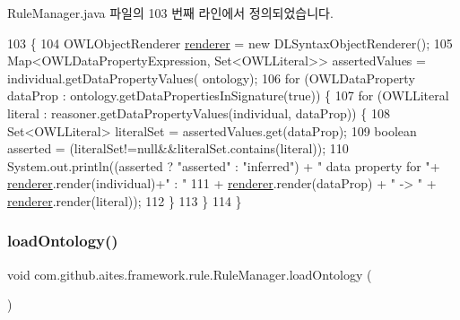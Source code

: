 Rule\+Manager.\+java 파일의 103 번째 라인에서 정의되었습니다.


\begin{DoxyCode}
103                                                                                                            
                     \{ 
104         OWLObjectRenderer \mbox{\hyperlink{classcom_1_1github_1_1aites_1_1framework_1_1rule_1_1_rule_manager_ae2bee87a9984ec9463cc7eaa5cc9952f}{renderer}} = \textcolor{keyword}{new} DLSyntaxObjectRenderer(); 
105         Map<OWLDataPropertyExpression, Set<OWLLiteral>> assertedValues = individual.getDataPropertyValues(
      ontology); 
106         \textcolor{keywordflow}{for} (OWLDataProperty dataProp : ontology.getDataPropertiesInSignature(\textcolor{keyword}{true})) \{ 
107             \textcolor{keywordflow}{for} (OWLLiteral literal : reasoner.getDataPropertyValues(individual, dataProp)) \{ 
108                 Set<OWLLiteral> literalSet = assertedValues.get(dataProp); 
109                 \textcolor{keywordtype}{boolean} asserted = (literalSet!=null&&literalSet.contains(literal)); 
110                 System.out.println((asserted ? \textcolor{stringliteral}{"asserted"} : \textcolor{stringliteral}{"inferred"}) + \textcolor{stringliteral}{" data property for "}+
      \mbox{\hyperlink{classcom_1_1github_1_1aites_1_1framework_1_1rule_1_1_rule_manager_ae2bee87a9984ec9463cc7eaa5cc9952f}{renderer}}.render(individual)+\textcolor{stringliteral}{" : "} 
111                         + \mbox{\hyperlink{classcom_1_1github_1_1aites_1_1framework_1_1rule_1_1_rule_manager_ae2bee87a9984ec9463cc7eaa5cc9952f}{renderer}}.render(dataProp) + \textcolor{stringliteral}{" -> "} + \mbox{\hyperlink{classcom_1_1github_1_1aites_1_1framework_1_1rule_1_1_rule_manager_ae2bee87a9984ec9463cc7eaa5cc9952f}{renderer}}.render(literal)); 
112             \} 
113         \} 
114     \} 
\end{DoxyCode}
\mbox{\label{classcom_1_1github_1_1aites_1_1framework_1_1rule_1_1_rule_manager_a864b1fcad12d92c290abf1c5c4e7ce8a}} 
\subsubsection{\texorpdfstring{load\+Ontology()}{loadOntology()}}
{\footnotesize\ttfamily void com.\+github.\+aites.\+framework.\+rule.\+Rule\+Manager.\+load\+Ontology (\begin{DoxyParamCaption}{ }\end{DoxyParamCaption})}




